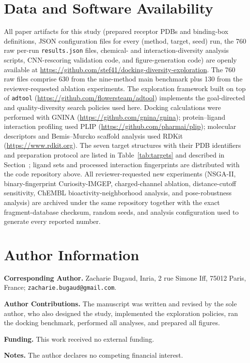 \documentclass[journal=jcisd8,manuscript=article]{achemso}
\begin{document}
\section*{Data and Software Availability}
All paper artifacts for this study (prepared receptor PDBs and binding-box definitions, JSON configuration files for every (method, target, seed) run, the 760 raw per-run \texttt{results.json} files, chemical- and interaction-diversity analysis scripts, CNN-rescoring validation code, and figure-generation code) are openly available at \url{https://github.com/stef41/docking-diversity-exploration}. The 760 raw files comprise 630 from the nine-method main benchmark plus 130 from the reviewer-requested ablation experiments. The exploration framework built on top of \texttt{adtool} (\url{https://github.com/flowersteam/adtool}) implements the goal-directed and quality-diversity search policies used here. Docking calculations were performed with GNINA (\url{https://github.com/gnina/gnina}); protein--ligand interaction profiling used PLIP (\url{https://github.com/pharmai/plip}); molecular descriptors and Bemis--Murcko scaffold analysis used RDKit (\url{https://www.rdkit.org}). The seven target structures with their PDB identifiers and preparation protocol are listed in Table~\ref{tab:targets} and described in Section~; ligand sets and processed interaction fingerprints are distributed with the code repository above. All reviewer-requested new experiments (NSGA-II, binary-fingerprint Curiosity-IMGEP, charged-channel ablation, distance-cutoff sensitivity, ChEMBL bioactivity-neighborhood analysis, and pose-robustness analysis) are archived under the same repository together with the exact fragment-database checksum, random seeds, and analysis configuration used to generate every reported number.

\section*{Author Information}

\textbf{Corresponding Author.} Zacharie Bugaud, Inria, 2 rue Simone Iff, 75012 Paris, France; \texttt{zacharie.bugaud@gmail.com}.

\textbf{Author Contributions.} The manuscript was written and revised by the sole author, who also designed the study, implemented the exploration policies, ran the docking benchmark, performed all analyses, and prepared all figures.

\textbf{Funding.} This work received no external funding.

\textbf{Notes.} The author declares no competing financial interest.


\end{document}
